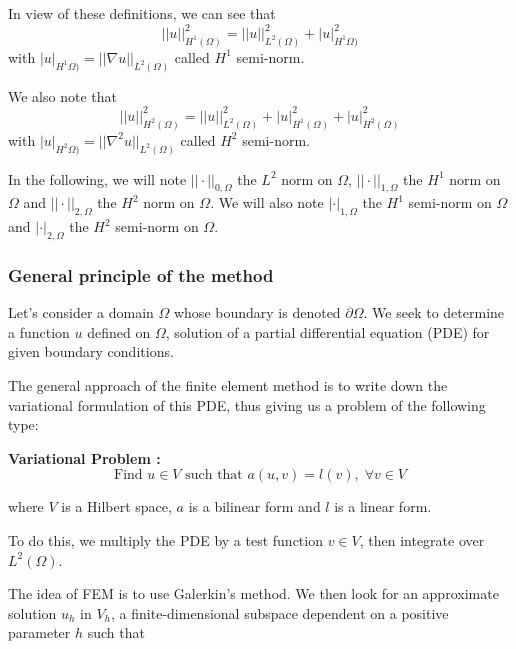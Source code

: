 \begin{Rem}
	In view of these definitions, we can see that
	\begin{equation*}
		||u||^2_{H^1(\Omega)}=||u||^2_{L^2(\Omega)}+|u|^2_{H^1\Omega)}
	\end{equation*}
	with $|u|_{H^1\Omega)}=||\nabla u||_{L^2(\Omega)}$ called $H^1$ semi-norm.
	
	We also note that
	\begin{equation*}
		||u||^2_{H^2(\Omega)}=||u||^2_{L^2(\Omega)}+|u|^2_{H^1(\Omega)}+|u|^2_{H^2(\Omega)}
	\end{equation*}
	with $|u|_{H^2\Omega)}=||\nabla^2 u||_{L^2(\Omega)}$ called $H^2$ semi-norm.
\end{Rem}

\begin{Rem}
	In the following, we will note $||\cdot||_{0,\Omega}$ the $L^2$ norm on $\Omega$, $||\cdot||_{1,\Omega}$ the $H^1$ norm on $\Omega$ and $||\cdot||_{2,\Omega}$ the $H^2$ norm on $\Omega$.
	We will also note $|\cdot|_{1,\Omega}$ the $H^1$ semi-norm on $\Omega$ and $|\cdot|_{2,\Omega}$ the $H^2$ semi-norm on $\Omega$.
\end{Rem}

\subsubsection{General principle of the method} \label{FEMs.FEM.principle}

Let's consider a domain $\Omega$ whose boundary is denoted $\partial\Omega$. We seek to determine a function $u$ defined on $\Omega$, solution of a partial differential equation (PDE) for given boundary conditions.

The general approach of the finite element method is to write down the variational formulation of this PDE, thus giving us a problem of the following type:

\textbf{Variational Problem :}
\begin{equation*}
	\text{Find } u\in V \text{ such that } a(u,v)=l(v), \;\forall v\in V
\end{equation*}

where $V$ is a Hilbert space, $a$ is a bilinear form and $l$ is a linear form.

To do this, we multiply the PDE by a test function $v\in V$, then integrate over $L^2(\Omega)$.

The idea of FEM is to use Galerkin's method. We then look for an approximate solution $u_h$ in $V_h$, a finite-dimensional subspace dependent on a positive parameter $h$ such that

